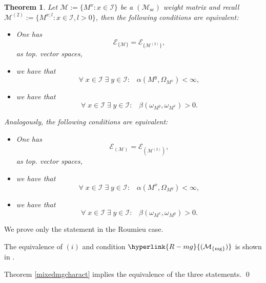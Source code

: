 \documentclass[10pt]{amsart}%
\numberwithin{equation}{section}
\theoremstyle{plain}
\newtheorem{theorem}[proposition]{Theorem}
\let\on=\operatorname
\begin{document}
\begin{theorem}\label{Thm34testfunc}
Let $\mathcal{M}:=\{M^x: x\in\mathcal{I}\}$ be a \hyperlink{Msc}{$(\mathcal{M}_{\on{sc}})$} weight matrix and recall $\mathcal{M}^{(2)}:=\{M^{x;l}: x\in\mathcal{I}, l>0\}$, then the following conditions are equivalent:
\begin{itemize}
\item[$(i)$] One has
$$\mathcal{E}_{\{\mathcal{M}\}}=\mathcal{E}_{\{\mathcal{M}^{(2)}\}},$$
as top. vector spaces,

\item[$(ii)$] we have that
$$\forall\;x\in\mathcal{I}\;\exists\;y\in\mathcal{I}:\;\;\;\alpha(M^y,\Omega_{M^x}) <\infty,$$

\item[$(iii)$] we have that
$$\forall\;x\in\mathcal{I}\;\exists\;y\in\mathcal{I}:\;\;\;\beta(\omega_{M^y},\omega_{M^x})>0.$$

\end{itemize}

Analogously,  the following conditions are equivalent:
\begin{itemize}
\item[$(i)$] One has
$$\mathcal{E}_{(\mathcal{M})}=\mathcal{E}_{(\mathcal{M}^{(2)})},$$
as top. vector spaces,

\item[$(ii)$] we have that
$$\forall\;x\in\mathcal{I}\;\exists\;y\in\mathcal{I}:\;\;\;\alpha(M^x,\Omega_{M^y}) <\infty,$$

\item[$(iii)$] we have that
$$\forall\;x\in\mathcal{I}\;\exists\;y\in\mathcal{I}:\;\;\;\beta(\omega_{M^x},\omega_{M^y})>0.$$
\end{itemize}
\end{theorem}

 We prove only the statement in the Roumieu case.

The equivalence of $(i)$ and condition $\hyperlink{R-mg}{(\mathcal{M}_{\{\on{mg}\}})}$ is shown in \cite[Theorem 3.7, Proposition 3.9]{testfunctioncharacterization}.

Theorem \ref{mixedmgcharact} implies the equivalence of the three statements.
\qed\enddemo
\end{document}
